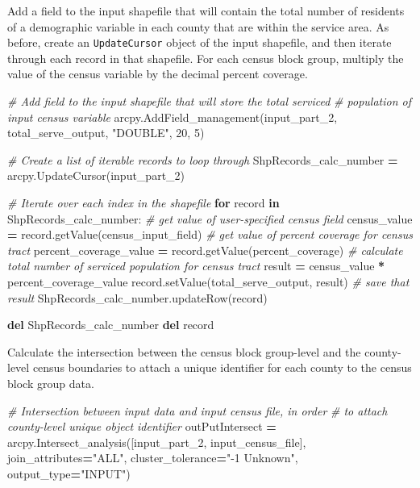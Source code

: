 \documentclass[11pt,]{article}
\newenvironment{Shaded}{\begin{snugshade}}{\end{snugshade}}
\newcommand{\KeywordTok}[1]{\textcolor[rgb]{0.13,0.29,0.53}{\textbf{{#1}}}}
\newcommand{\DecValTok}[1]{\textcolor[rgb]{0.00,0.00,0.81}{{#1}}}
\newcommand{\StringTok}[1]{\textcolor[rgb]{0.31,0.60,0.02}{{#1}}}
\newcommand{\CommentTok}[1]{\textcolor[rgb]{0.56,0.35,0.01}{\textit{{#1}}}}
\newcommand{\ControlFlowTok}[1]{\textcolor[rgb]{0.13,0.29,0.53}{\textbf{{#1}}}}
\newcommand{\OperatorTok}[1]{\textcolor[rgb]{0.81,0.36,0.00}{\textbf{{#1}}}}
\newcommand{\NormalTok}[1]{{#1}}
\begin{document}
\noindent Add a field to the input shapefile that will contain the total
number of residents of a demographic variable in each county that are
within the service area. As before, create an \texttt{UpdateCursor}
object of the input shapefile, and then iterate through each record in
that shapefile. For each census block group, multiply the value of the
census variable by the decimal percent coverage.

\begin{Shaded}
\begin{Highlighting}[]
    \CommentTok{# Add field to the input shapefile that will store the total serviced }
    \CommentTok{# population of input census variable}
    \NormalTok{arcpy.AddField_management(input_part_2, total_serve_output,}
                              \StringTok{"DOUBLE"}\NormalTok{, }\DecValTok{20}\NormalTok{, }\DecValTok{5}\NormalTok{)}

    \CommentTok{# Create a list of iterable records to loop through}
    \NormalTok{ShpRecords_calc_number }\OperatorTok{=} \NormalTok{arcpy.UpdateCursor(input_part_2)}

    \CommentTok{# Iterate over each index in the shapefile}
    \ControlFlowTok{for} \NormalTok{record }\OperatorTok{in} \NormalTok{ShpRecords_calc_number:}
        \CommentTok{# get value of user-specified census field}
        \NormalTok{census_value }\OperatorTok{=} \NormalTok{record.getValue(census_input_field)}
        \CommentTok{# get value of percent coverage for census tract}
        \NormalTok{percent_coverage_value }\OperatorTok{=} \NormalTok{record.getValue(percent_coverage)}
        \CommentTok{# calculate total number of serviced population for census tract}
        \NormalTok{result }\OperatorTok{=} \NormalTok{census_value }\OperatorTok{*} \NormalTok{percent_coverage_value             }
        \NormalTok{record.setValue(total_serve_output, result) }\CommentTok{# save that result               }
        \NormalTok{ShpRecords_calc_number.updateRow(record)}

    \KeywordTok{del} \NormalTok{ShpRecords_calc_number}
    \KeywordTok{del} \NormalTok{record}
\end{Highlighting}
\end{Shaded}

\noindent Calculate the intersection between the census block
group-level and the county-level census boundaries to attach a unique
identifier for each county to the census block group data.

\begin{Shaded}
\begin{Highlighting}[]
    \CommentTok{# Intersection between input data and input census file, in order}
    \CommentTok{# to attach county-level unique object identifier}
    \NormalTok{outPutIntersect }\OperatorTok{=} \NormalTok{arcpy.Intersect_analysis([input_part_2, input_census_file],}
                             \NormalTok{join_attributes}\OperatorTok{=}\StringTok{"ALL"}\NormalTok{, cluster_tolerance}\OperatorTok{=}\StringTok{"-1 Unknown"}\NormalTok{,}
                             \NormalTok{output_type}\OperatorTok{=}\StringTok{"INPUT"}\NormalTok{)}
\end{Highlighting}
\end{Shaded}
\end{document}
